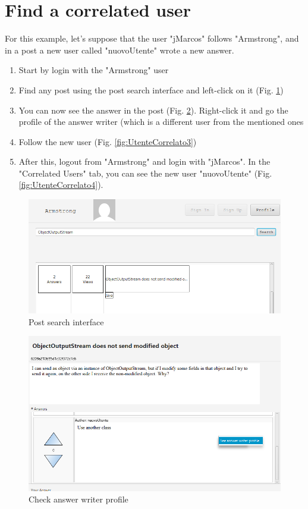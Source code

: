 \documentclass[11pt]{report}
\begin{document}
\section{Find a correlated user}
For this example, let's suppose that the user "jMarcos" follows "Armstrong", and in a post a new user called "nuovoUtente" wrote a new answer.
\begin{enumerate}
    \item Start by login with the "Armstrong" user
    \item Find any post using the post search interface and left-click on it (Fig. \ref{fig:UtenteCorrelato1})
    \item You can now see the answer in the post (Fig. \ref{fig:UtenteCorrelato2}). Right-click it and go the profile of the answer writer (which is a different user from the mentioned ones
    \item Follow the new user (Fig. \ref{fig:UtenteCorrelato3})
    \item After this, logout from "Armstrong" and login with "jMarcos". In the "Correlated Users" tab, you can see the new user "nuovoUtente" (Fig. \ref{fig:UtenteCorrelato4}).
\end{enumerate}
\begin{figure}[H]
  \centering
  \includegraphics[width=\textwidth,keepaspectratio=true]{img/user_manual/UtenteCorrelato1.png}
  \caption{Post search interface}
  \label{fig:UtenteCorrelato1}
\end{figure}
\begin{figure}[H]
  \centering
  \includegraphics[width=\textwidth,keepaspectratio=true]{img/user_manual/UtenteCorrelato2.png}
  \caption{Check answer writer profile}
  \label{fig:UtenteCorrelato2}
\end{figure}
\end{document}
